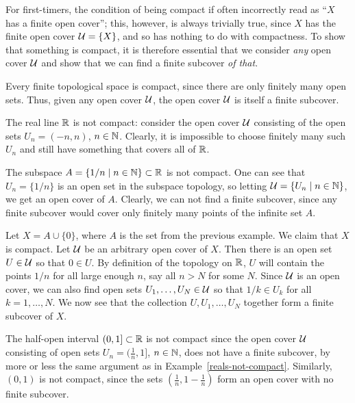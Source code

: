 For first-timers, the condition of being compact if often incorrectly read as ``$X$ has a finite open cover''; this, however, is always trivially true, since $X$ has the finite open cover $\mathcal{U} = \{X\}$, and so has nothing to do with compactness. To show that something is compact, it is therefore essential that we consider \emph{any} open cover $\mathcal{U}$ and show that we can find a finite subcover \emph{of that}.
\begin{example}
  Every finite topological space is compact, since there are only finitely many open sets. Thus, given any open cover $\mathcal{U}$, the open cover $\mathcal{U}$ is itself a finite subcover.
\end{example}
\begin{example}
  \label{reals-not-compact}
  The real line $\mathbb{R}$ is not compact: consider the open cover $\mathcal{U}$ consisting of the open sets $U_n = (-n,n)$, $n \in \mathbb{N}$. Clearly, it is impossible to choose finitely many such $U_n$ and still have something that covers all of $\mathbb{R}$.
\end{example}
\begin{example}
  The subspace $A = \{1/n \mid n \in \mathbb{N}\} \subset \mathbb{R}$ is not compact. One can see that $U_n = \{1/n\}$ is an open set in the subspace topology, so letting $\mathcal{U} = \{U_n \mid n \in \mathbb{N}\}$, we get an open cover of $A$. Clearly, we can not find a finite subcover, since any finite subcover would cover only finitely many points of the infinite set $A$.
\end{example}
\begin{example}
  Let $X = A \cup \{0\}$, where $A$ is the set from the previous example. We claim that $X$ is compact. Let $\mathcal{U}$ be an arbitrary open cover of $X$. Then there is an open set $U \in \mathcal{U}$ so that $0 \in U$. By definition of the topology on $\mathbb{R}$, $U$ will contain the points $1/n$ for all large enough $n$, say all $n > N$ for some $N$. Since $\mathcal{U}$ is an open cover, we can also find open sets $U_1, \dots, U_N \in \mathcal{U}$ so that $1/k \in U_k$ for all $k = 1, \dots, N$. We now see that the collection $U, U_1, \dots, U_N$ together form a finite subcover of $X$.
\end{example}
\begin{example}
  The half-open interval $(0,1] \subset \mathbb{R}$ is not compact since the open cover $\mathcal{U}$ consisting of open sets $U_n = (\tfrac{1}{n},1]$, $n \in \mathbb{N}$, does not have a finite subcover, by more or less the same argument as in Example~\ref{reals-not-compact}. Similarly, $(0,1)$ is not compact, since the sets $(\tfrac{1}{n},1-\tfrac{1}{n})$ form an open cover with no finite subcover.
\end{example}
